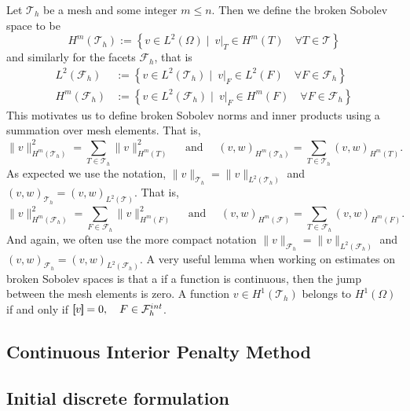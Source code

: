 Let $\mathcal{T}_{h} $ be a mesh and some integer $m\le n$. Then we define the broken Sobolev space to be \[
H^{m}( \mathcal{T}_{h} ) := \left\{ v \in L^2( \Omega )  \mid \ v|_{T} \in H^{m}( T) \quad     \forall T \in  \mathcal{T} \right\}
\]
and similarly for the facets $\mathcal{F}_{h} $, that is
\[
    \begin{split}
        L^{2}( \mathcal{F}_{h} ) &:= \left\{ v \in L^2( \mathcal{T}_{h}  )  \mid   \ v|_{F} \in L^{2}( F)  \quad  \forall F \in  \mathcal{F}_{h}   \right\} \\
        H^{m}( \mathcal{F}_{h} ) &:= \left\{ v \in L^2( \mathcal{F}_{h}  )  \mid   \ v|_{F} \in H^{m}( F)  \quad  \forall F \in  \mathcal{F}_{h}   \right\}
    \end{split}
\]
This motivates us to define broken Sobolev norms and inner products using a summation over mesh elements. That is,
\[
 \| v \|_{H^{m}( \mathcal{T}_{h} ) }^{2} = \sum_{T \in  \mathcal{T}_{h} }^{} \| v  \|_{ H^{m}( T ) }^{2  } \quad \text{ and } \quad
 (v ,w )_{H^{m}( \mathcal{T}_{h} ) }^{} = \sum_{T \in \mathcal{T} _{h}}^{} (v ,w )_{ H^{m}( T ) }^{  } .
\]
As expected we use the notation,  $\| v \|_{\mathcal{T}_{h}} =  \| v \|_{L^{2}( \mathcal{T}_{h} ) }$ and  $(v ,w )_{ \mathcal{T}_{h} }^{} = (v ,w )_{L^2( \mathcal{T} ) }^{} $.
That is,
\[
 \| v \|_{H^{m}( \mathcal{F}_{h} ) }^{2} = \sum_{F \in  \mathcal{F}_{h} }^{} \| v  \|_{ H^{m}( F ) }^{2  } \quad \text{ and } \quad
 (v ,w )_{H^{m}( \mathcal{F} ) }^{} = \sum_{T \in \mathcal{F} _{h}}^{} (v ,w )_{ H^{m}( F ) }^{  } .
\]
And again, we often use the more compact notation $\| v \|_{\mathcal{F}_{h}} =  \| v \|_{L^{2}( \mathcal{F}_{h} ) }$ and  $(v ,w )_{ \mathcal{F}_{h} }^{} = (v ,w )_{L^2( \mathcal{F}_{h} ) }^{} $.
A very useful lemma when working on estimates on broken Sobolev spaces is that a if a function is continuous, then the jump between the mesh elements is zero. A function $ v \in  H^{1}( \mathcal{T}_{h} ) $ belongs to $ H^{1}( \Omega )  $ if and only if $ \left[\!\!\left[  v  \right]\!\!\right]   = 0, \quad F \in \mathcal{F}^{int}_{h}$.





\subsection{Continuous Interior Penalty Method }%
\label{sub:weak_formulation}





\subsection{Initial discrete formulation}%
\label{sub:initial_discrete_formulation}


